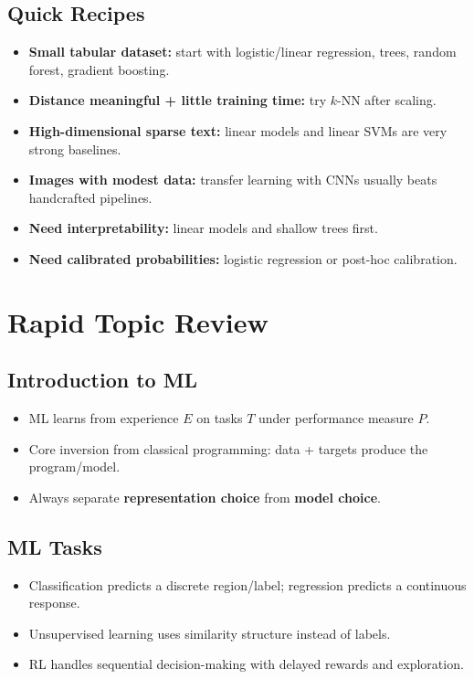 \documentclass[10pt,twocolumn]{article}
\begin{document}
\subsection{Quick Recipes}
\begin{itemize}
  \item \textbf{Small tabular dataset:} start with logistic/linear regression, trees, random forest, gradient boosting.
  \item \textbf{Distance meaningful + little training time:} try $k$-NN after scaling.
  \item \textbf{High-dimensional sparse text:} linear models and linear SVMs are very strong baselines.
  \item \textbf{Images with modest data:} transfer learning with CNNs usually beats handcrafted pipelines.
  \item \textbf{Need interpretability:} linear models and shallow trees first.
  \item \textbf{Need calibrated probabilities:} logistic regression or post-hoc calibration.
\end{itemize}

\section{Rapid Topic Review}
\subsection{Introduction to ML}
\begin{itemize}
  \item ML learns from experience $E$ on tasks $T$ under performance measure $P$.
  \item Core inversion from classical programming: data + targets produce the program/model.
  \item Always separate \textbf{representation choice} from \textbf{model choice}.
\end{itemize}

\subsection{ML Tasks}
\begin{itemize}
  \item Classification predicts a discrete region/label; regression predicts a continuous response.
  \item Unsupervised learning uses similarity structure instead of labels.
  \item RL handles sequential decision-making with delayed rewards and exploration.
\end{itemize}
\end{document}
